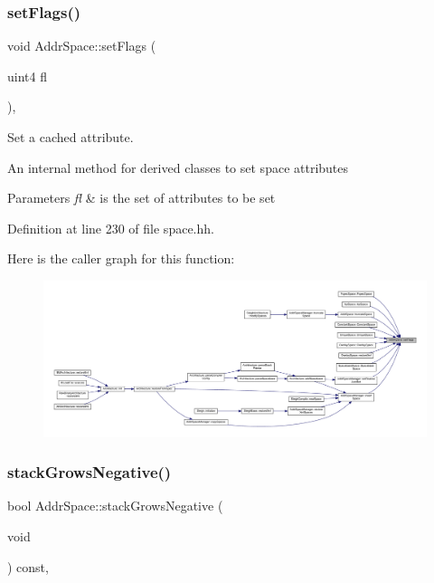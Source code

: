 \subsubsection{\texorpdfstring{setFlags()}{setFlags()}}
{\footnotesize\ttfamily void Addr\+Space\+::set\+Flags (\begin{DoxyParamCaption}\item[{uint4}]{fl }\end{DoxyParamCaption})\hspace{0.3cm}{\ttfamily [inline]}, {\ttfamily [protected]}}



Set a cached attribute. 

An internal method for derived classes to set space attributes 
\begin{DoxyParams}{Parameters}
{\em fl} & is the set of attributes to be set \\
\hline
\end{DoxyParams}


Definition at line 230 of file space.\+hh.

Here is the caller graph for this function\+:
\nopagebreak
\begin{figure}[H]
\begin{center}
\leavevmode
\includegraphics[width=350pt]{class_addr_space_a3dd14c033be519525d486fcbc94a2bf7_icgraph}
\end{center}
\end{figure}
\mbox{\label{class_addr_space_a9468b2d0bc4cdaa762e213fb395ac434}} 
\subsubsection{\texorpdfstring{stackGrowsNegative()}{stackGrowsNegative()}}
{\footnotesize\ttfamily bool Addr\+Space\+::stack\+Grows\+Negative (\begin{DoxyParamCaption}\item[{void}]{ }\end{DoxyParamCaption}) const\hspace{0.3cm}{\ttfamily [inline]}, {\ttfamily [virtual]}}



